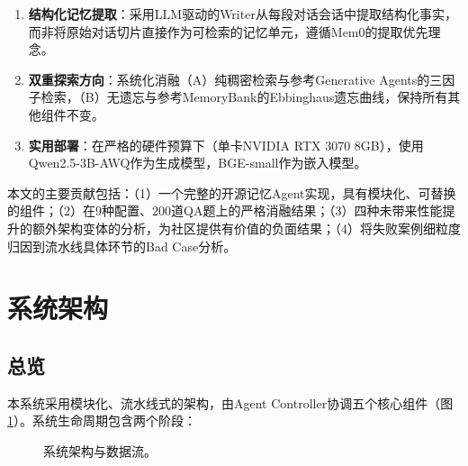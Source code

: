 \documentclass[11pt,a4paper]{ctexart}
\begin{document}
\begin{enumerate}[nosep]
    \item \textbf{结构化记忆提取}：采用LLM驱动的Writer从每段对话会话中提取结构化事实，而非将原始对话切片直接作为可检索的记忆单元，遵循Mem0的提取优先理念。
    \item \textbf{双重探索方向}：系统化消融（A）纯稠密检索与参考Generative Agents的三因子检索，（B）无遗忘与参考MemoryBank的Ebbinghaus遗忘曲线，保持所有其他组件不变。
    \item \textbf{实用部署}：在严格的硬件预算下（单卡NVIDIA RTX 3070 8GB），使用Qwen2.5-3B-AWQ作为生成模型，BGE-small作为嵌入模型。
\end{enumerate}

本文的主要贡献包括：（1）一个完整的开源记忆Agent实现，具有模块化、可替换的组件；（2）在9种配置、200道QA题上的严格消融结果；（3）四种未带来性能提升的额外架构变体的分析，为社区提供有价值的负面结果；（4）将失败案例细粒度归因到流水线具体环节的Bad Case分析。

\section{系统架构}

\subsection{总览}

本系统采用模块化、流水线式的架构，由Agent Controller协调五个核心组件（图\ref{fig:arch}）。系统生命周期包含两个阶段：

\begin{figure}[H]
\centering
{}
\caption{系统架构与数据流。}
\label{fig:arch}
\end{figure}
\end{document}
